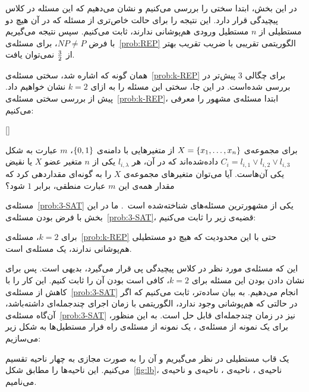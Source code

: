 

در این بخش، ابتدا سختی  را بررسی می‌کنیم و نشان می‌دهیم که این مسئله در کلاس پیچیدگی  قرار دارد. این نتیجه را برای حالت خاص‌تری از مسئله که در آن هیچ دو مستطیلی از $n$ مستطیل ورودی هم‌پوشانی ندارند، ثابت می‌کنیم. سپس نتیجه می‌گیریم با فرض $NP \neq P$، برای مسئله‌ی~\ref{prob:REP} الگوریتمی تقریبی با ضریب تقریب بهتر از ${3} \over {2}$ نمی‌توان یافت.


همان گونه که اشاره شد، سختی مسئله‌ی~\ref{prob:k-REP} برای چگالی $3$ پیش‌تر در \cite{REP} بررسی شده‌است. در این جا، سختی این مسئله را به ازای $k = 2$ نشان خواهیم داد. پیش از بررسی سختی مسئله‌ی~\ref{prob:k-REP}، ابتدا مسئله‌ی مشهور  را معرفی می‌کنیم:

[]
\label{prob:3-SAT}

برای مجموعه‌ی $X = {\{ x_{1}, \ldots, x_{n} \}}$ از متغیر‌هایی با دامنه‌ی ${\{ 0, 1 \}}$، $m$ عبارت به شکل $C_{i} = l_{i, 1} \vee l_{i, 2} \vee l_{i, 3}$ داده‌شده‌اند که در آن، هر $l_{i, \lambda}$ یکی از $n$ متغیر‌ عضو $X$ یا نقیض یکی آن‌هاست.
آیا می‌توان متغیر‌های مجموعه‌ی $X$ را به گونه‌ای مقداردهی کرد که مقدار همه‌ی این $m$ عبارت‌ منطقی، برابر $1$ شود؟


مسئله‌ی~\ref{prob:3-SAT} یکی از مشهور‌ترین مسئله‌های  شناخته‌شده است~\cite{Karp}. ما در این بخش با فرض  بودن مسئله‌ی~\ref{prob:3-SAT}، قضیه‌ی زیر را ثابت می‌کنیم:

\label{theorem:NP-complete-2REP}

برای $k = 2$، مسئله‌ی~\ref{prob:k-REP} حتی با این محدودیت که هیچ دو مستطیلی هم‌پوشانی ندارند، یک مسئله‌ی  است.



این که مسئله‌ی مورد نظر در کلاس پیچیدگی ‌پی{} قرار می‌گیرد، بدیهی است. پس برای نشان دادن  بودن این مسئله برای $k = 2$، کافی است  بودن آن را ثابت کنیم. این کار را با کاهش از مسئله‌ی~\ref{prob:3-SAT} انجام می‌دهیم. به بیان ساده‌تر، ثابت می‌کنیم که اگر  در حالتی که هم‌پوشانی وجود ندارد، الگوریتمی با زمان اجرای چند‌جمله‌ای داشته‌باشد، آن‌گاه مسئله‌ی~\ref{prob:3-SAT} نیز در زمان چند‌جمله‌ای قابل حل است. به این منظور، برای یک نمونه از مسئله‌ی ، یک نمونه از مسئله‌ی راه فرار مستطیل‌ها به شکل زیر می‌سازیم:

یک قاب مستطیلی در نظر می‌گیریم و آن را به صورت مجازی به چهار ناحیه تقسیم می‌کنیم. این ناحیه‌ها را مطابق شکل~\ref{fig:lb}، ناحیه‌ی ، ناحیه‌ی ، ناحیه‌ی  و ناحیه‌ی  می‌نامیم.

